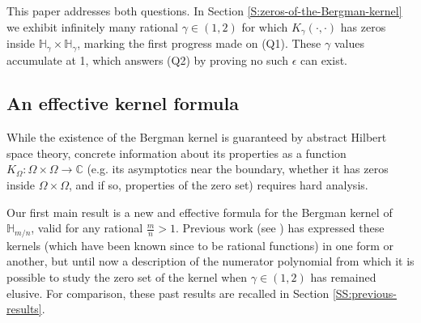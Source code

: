 \documentclass[letterpaper,11pt,reqno]{amsart}
\theoremstyle{plain}
\theoremstyle{definition}
\theoremstyle{remark}
\theoremstyle{remark}
\numberwithin{equation}{section}
\newcommand{\C}{{\mathbb C}}
\newcommand{\h}{{\mathbb H}}
\begin{document}
This paper addresses both questions.
In Section \ref{S:zeros-of-the-Bergman-kernel} we exhibit infinitely many rational $\gamma \in (1,2)$ for which $K_\gamma(\cdot,\cdot)$ has zeros inside $\h_\gamma \times \h_\gamma$, marking the first progress made on (Q1).
These $\gamma$ values accumulate at 1, which answers (Q2) by proving no such $\epsilon$ can exist.

\subsection{An effective kernel formula}

While the existence of the Bergman kernel is guaranteed by abstract Hilbert space theory, concrete information about its properties as a function $K_\Omega : \Omega \times \Omega \to \C$ (e.g. its asymptotics near the boundary, whether it has zeros inside $\Omega \times \Omega$, and if so, properties of the zero set) requires hard analysis.

Our first main result is a new and effective formula for the Bergman kernel of $\h_{m/n}$, valid for any rational $\frac{m}{n} > 1$.
Previous work (see \cite{EdhMcN16b,CKMM20,Almugh23}) has expressed these kernels (which have been known since \cite{EdhMcN16b} to be rational functions) in one form or another, but until now a description of the numerator polynomial from which it is possible to study the zero set of the kernel when $\gamma \in (1,2)$ has remained elusive.
For comparison, these past results are recalled in Section \ref{SS:previous-results}.
\end{document}
